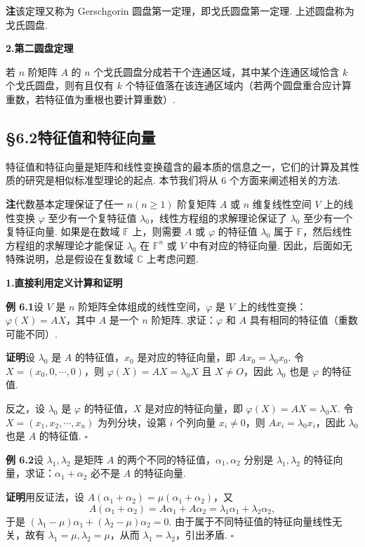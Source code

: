 \documentclass[UTF8, 12pt, fontset=fandol, oneside]{ctexart}
\begin{document}
\noindent\textbf{注}\quad 该定理又称为 Gerschgorin 圆盘第一定理，即戈氏圆盘第一定理. 上述圆盘称为戈氏圆盘.

\noindent\textbf{2.\quad 第二圆盘定理}

若 $n$ 阶矩阵 $A$ 的 $n$ 个戈氏圆盘分成若干个连通区域，其中某个连通区域恰含 $k$ 个戈氏圆盘，则有且仅有 $k$ 个特征值落在该连通区域内（若两个圆盘重合应计算重数，若特征值为重根也要计算重数）.

\subsection*{§6.2\quad 特征值和特征向量}

特征值和特征向量是矩阵和线性变换蕴含的最本质的信息之一，它们的计算及其性质的研究是相似标准型理论的起点. 本节我们将从 6 个方面来阐述相关的方法.

\noindent\textbf{注}\quad 代数基本定理保证了任一 $n(n\ge 1)$ 阶复矩阵 $A$ 或 $n$ 维复线性空间 $V$ 上的线性变换 $\varphi$ 至少有一个复特征值 $\lambda_0$，线性方程组的求解理论保证了 $\lambda_0$ 至少有一个复特征向量. 如果是在数域 $\mathbb{F}$ 上，则需要 $A$ 或 $\varphi$ 的特征值 $\lambda_0$ 属于 $\mathbb{F}$，然后线性方程组的求解理论才能保证 $\lambda_0$ 在 $\mathbb{F}^n$ 或 $V$ 中有对应的特征向量. 因此，后面如无特殊说明，总是假设在复数域 $\mathbb{C}$ 上考虑问题.

\noindent\textbf{1.\quad 直接利用定义计算和证明}

\noindent\textbf{例 6.1}\quad 设 $V$ 是 $n$ 阶矩阵全体组成的线性空间，$\varphi$ 是 $V$ 上的线性变换：$\varphi(X)=AX$，其中 $A$ 是一个 $n$ 阶矩阵. 求证：$\varphi$ 和 $A$ 具有相同的特征值（重数可能不同）.

\noindent\textbf{证明}\quad 设 $\lambda_0$ 是 $A$ 的特征值，$x_0$ 是对应的特征向量，即 $Ax_0=\lambda_0x_0$. 令 $X=(x_0,0,\cdots,0)$，则 $\varphi(X)=AX=\lambda_0X$ 且 $X\ne O$，因此 $\lambda_0$ 也是 $\varphi$ 的特征值.

反之，设 $\lambda_0$ 是 $\varphi$ 的特征值，$X$ 是对应的特征向量，即 $\varphi(X)=AX=\lambda_0X$. 令 $X=(x_1,x_2,\cdots,x_n)$ 为列分块，设第 $i$ 个列向量 $x_i\ne 0$，则 $Ax_i=\lambda_0x_i$，因此 $\lambda_0$ 也是 $A$ 的特征值. $\square$

\noindent\textbf{例 6.2}\quad 设 $\lambda_1,\lambda_2$ 是矩阵 $A$ 的两个不同的特征值，$\alpha_1,\alpha_2$ 分别是 $\lambda_1,\lambda_2$ 的特征向量，求证：$\alpha_1+\alpha_2$ 必不是 $A$ 的特征向量.

\noindent\textbf{证明}\quad 用反证法，设 $A(\alpha_1+\alpha_2)=\mu(\alpha_1+\alpha_2)$，又
\[
A(\alpha_1+\alpha_2)=A\alpha_1+A\alpha_2=\lambda_1\alpha_1+\lambda_2\alpha_2,
\]
于是 $(\lambda_1-\mu)\alpha_1+(\lambda_2-\mu)\alpha_2=0$. 由于属于不同特征值的特征向量线性无关，故有 $\lambda_1=\mu,\lambda_2=\mu$，从而 $\lambda_1=\lambda_2$，引出矛盾. $\square$
\end{document}
